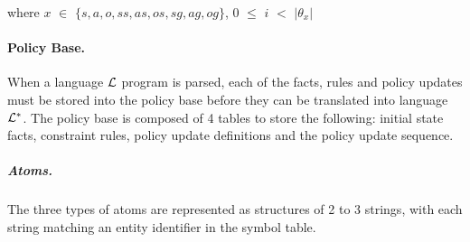\documentclass[10pt, twocolumn]{article}
\begin{document}
          where $x$ $\in$ $\{s,a,o,ss,as,os,sg,ag,og\}$, $0$ $\leq$ $i$ $<$ $|{\theta}_{x}|$

        \paragraph{Policy Base.}

          When a language ${\cal L}$ program is parsed, each of the facts,
          rules and policy updates must be stored into the policy base before
          they can be translated into language $\cal L^{*}$. The policy base is
          composed of 4 tables to store the following: initial state facts,
          constraint rules, policy update definitions and the policy update
          sequence.

          \subparagraph{Atoms.}

            The three types of atoms are represented as structures of 2 to 3
            strings, with each string matching an entity identifier in the
            symbol table.
\end{document}
